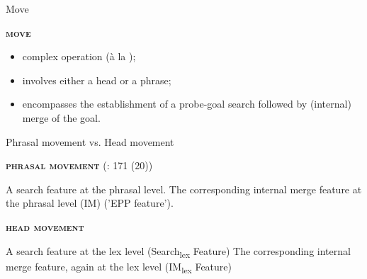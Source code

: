 \documentclass[lesson_slides]{subfiles}
\begin{document}
\begin{frame}[c]{Move}

    \noindent\textbf{\textsc{move}} \pause
    \begin{itemize}
        \item[\ding{227}] complex operation (à la \cite{chomsky2001});\\ \pause
        \item[\ding{227}] involves either a head or a phrase;\\ \pause
        \item[\ding{227}] encompasses the establishment of a probe-goal search followed by (internal) merge of the goal.
    \end{itemize}
        
\end{frame}
\begin{frame}[c]{Phrasal movement vs. Head movement}

    \noindent\textbf{\textsc{phrasal movement}} (\cite{rizzi2017}: 171 (20)) \pause
        \begin{xlist}
            \ex A search feature at the phrasal level. \pause
            \ex The corresponding internal merge feature at the phrasal level (IM) ('EPP feature'). \pause
        \end{xlist}

    \noindent\textbf{\textsc{head movement}} \pause
        \begin{xlist}
            \ex A search feature at the lex level (Search\textsubscript{lex} Feature) \pause
            \ex The corresponding internal merge feature, again at the lex level (IM\textsubscript{lex} Feature)
        \end{xlist}
        
\end{frame}
\end{document}

